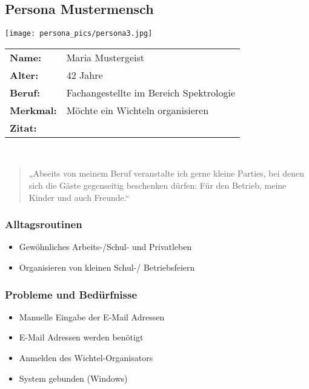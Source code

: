 \clearpage
\subsection{Persona Mustermensch}
\begin{minipage}[t][][b]{.25\textwidth}
\texttt{[image: persona\_pics/persona3.jpg]}\end{minipage}\hfill
%
\begin{minipage}[t][][b]{.72\textwidth}
\noindent%
\begin{tabular}{L{.25} L{.7}}
\textbf{Name:} & Maria Mustergeist\\
\textbf{Alter:} & 42 Jahre\\
\textbf{Beruf:} & Fachangestellte im Bereich Spektrologie\\
\textbf{Merkmal:} & Möchte ein Wichteln organisieren\\
\textbf{Zitat:} & \\
\end{tabular}\\
\begin{quote}
„Abseits von meinem Beruf veranstalte ich gerne kleine Parties, bei denen sich die Gäste gegenseitig beschenken dürfen: Für den Betrieb, meine Kinder und auch Freunde.“
\end{quote}
\end{minipage}\vspace*{1em}

\begin{minipage}[t][][b]{.48\textwidth}
\subsubsection*{Alltagsroutinen}%
\begin{itemize}[leftmargin=*]
\item Gewöhnliches Arbeits-/Schul- und Privatleben
\item Organisieren von kleinen Schul-/ Betriebsfeiern
\end{itemize}
\end{minipage}\hfill
%
\begin{minipage}[t]{.48\textwidth}
\subsubsection*{Probleme und Bedürfnisse}%
\begin{itemize}[leftmargin=*]
\item Manuelle Eingabe der E-Mail Adressen
\item E-Mail Adressen werden benötigt
\item Anmelden des Wichtel-Organisators
\item System gebunden (Windows)
\end{itemize}
\end{minipage}\bigskip


